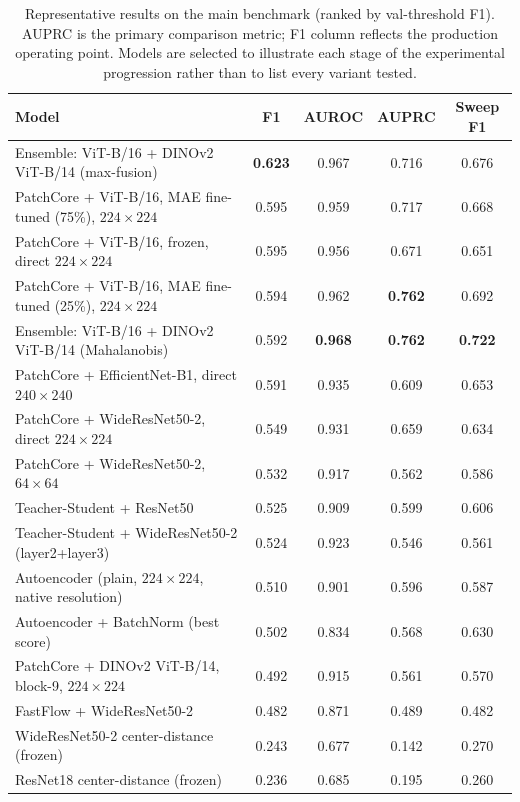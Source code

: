 \documentclass[11pt]{article}
\begin{document}
\begin{table}[H]
\centering
\caption{Representative results on the main benchmark (ranked by val-threshold F1).
AUPRC is the primary comparison metric; F1 column reflects the production operating point.
Models are selected to illustrate each stage of the experimental progression
rather than to list every variant tested.}
\label{tab:main_leaderboard}
\begin{tabularx}{\linewidth}{>{\raggedright\arraybackslash}Xcccc}
\toprule
Model & F1 & AUROC & AUPRC & Sweep F1 \\
\midrule
Ensemble: ViT-B/16 + DINOv2 ViT-B/14 (max-fusion)            & \textbf{0.623} & 0.967 & 0.716 & 0.676 \\
PatchCore + ViT-B/16, MAE fine-tuned (75\%), $224\!\times\!224$ & 0.595 & 0.959 & 0.717 & 0.668 \\
PatchCore + ViT-B/16, frozen, direct $224\!\times\!224$         & 0.595 & 0.956 & 0.671 & 0.651 \\
PatchCore + ViT-B/16, MAE fine-tuned (25\%), $224\!\times\!224$ & 0.594 & 0.962 & \textbf{0.762} & 0.692 \\
Ensemble: ViT-B/16 + DINOv2 ViT-B/14 (Mahalanobis)           & 0.592 & \textbf{0.968} & \textbf{0.762} & \textbf{0.722} \\
PatchCore + EfficientNet-B1, direct $240\!\times\!240$       & 0.591 & 0.935 & 0.609 & 0.653 \\
PatchCore + WideResNet50-2, direct $224\!\times\!224$        & 0.549 & 0.931 & 0.659 & 0.634 \\
PatchCore + WideResNet50-2, $64\!\times\!64$                 & 0.532 & 0.917 & 0.562 & 0.586 \\
Teacher-Student + ResNet50                                   & 0.525 & 0.909 & 0.599 & 0.606 \\
Teacher-Student + WideResNet50-2 (layer2+layer3)             & 0.524 & 0.923 & 0.546 & 0.561 \\
Autoencoder (plain, $224\!\times\!224$, native resolution)   & 0.510 & 0.901 & 0.596 & 0.587 \\
Autoencoder + BatchNorm (best score)                         & 0.502 & 0.834 & 0.568 & 0.630 \\
PatchCore + DINOv2 ViT-B/14, block-9, $224\!\times\!224$    & 0.492 & 0.915 & 0.561 & 0.570 \\
FastFlow + WideResNet50-2                                    & 0.482 & 0.871 & 0.489 & 0.482 \\
WideResNet50-2 center-distance (frozen)                      & 0.243 & 0.677 & 0.142 & 0.270 \\
ResNet18 center-distance (frozen)                            & 0.236 & 0.685 & 0.195 & 0.260 \\
\bottomrule
\end{tabularx}
\end{table}
\end{document}
